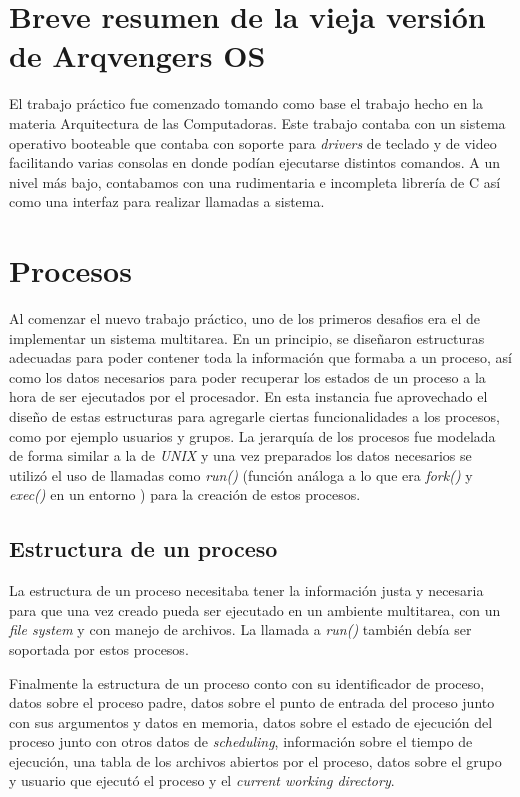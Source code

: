 \documentclass[a4paper,10pt]{article}
\begin{document}
\newpage
\section{Breve resumen de la vieja versión de Arqvengers OS}
El trabajo práctico fue comenzado tomando como base el trabajo hecho en la materia Arquitectura de las Computadoras.
 Este trabajo contaba con un sistema operativo booteable que contaba con soporte para \textit{drivers} de
  teclado y de video facilitando varias consolas en donde podían ejecutarse distintos comandos. 
  A un nivel más bajo, contabamos con una rudimentaria e incompleta librería de C así como una interfaz para realizar
  llamadas a sistema.
\newpage
\section{Procesos}
    Al comenzar el nuevo trabajo práctico, uno de los primeros desafios era el de implementar un sistema multitarea.
     En un principio, se diseñaron estructuras adecuadas para poder contener toda la información que formaba a un proceso,
      así como los datos necesarios para poder recuperar los estados de un proceso a la hora de ser ejecutados
      por el procesador. En esta instancia fue aprovechado el diseño de estas estructuras para agregarle ciertas
      funcionalidades a los procesos, como por ejemplo usuarios y grupos.
     La jerarquía de los procesos fue modelada de forma similar a la de \textit{UNIX} y una vez preparados los datos
      necesarios se utilizó el uso de llamadas como \textit{run()} (función análoga a lo que era \textit{fork()} y
      \textit{exec()} en un entorno ) para la creación de estos procesos.

    \subsection{Estructura de un proceso}
    
    La estructura de un proceso necesitaba tener la información justa y necesaria para que una vez creado pueda ser 
    ejecutado en un ambiente multitarea, con un \textit{file system} y con manejo de archivos. La llamada a 
    \textit{run()} también debía ser soportada por estos procesos.

    Finalmente la estructura de un proceso conto con su identificador de proceso, datos sobre el proceso padre, datos
    sobre el punto de entrada del proceso junto con sus argumentos y datos en memoria, datos sobre el estado de ejecución
    del proceso junto con otros datos de \textit{scheduling}, información sobre el tiempo de ejecución, una tabla de
    los archivos abiertos por el proceso, datos sobre el grupo y usuario que ejecutó el proceso y el 
    \textit{current working directory}.
\end{document}
